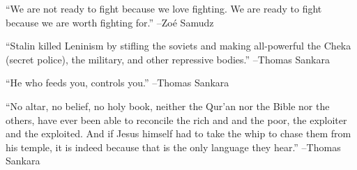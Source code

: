 \documentclass{article}%
\begin{document}
\vspace{1mm}%
\begin{minipage}{\textwidth}%
\flushleft%
“We are not ready to fight because we love fighting. We are ready to fight because we are worth fighting for.”%
\linebreak%
\vspace{1mm}%
–Zoé Samudz%
\linebreak%
\vspace{1mm}%
\end{minipage}%
\linebreak%
\vspace{1mm}%
\begin{minipage}{\textwidth}%
\flushleft%
“Stalin killed Leninism by stifling the soviets and making all{-}powerful the Cheka (secret police), the military, and other repressive bodies.”%
\linebreak%
\vspace{1mm}%
–Thomas Sankara%
\linebreak%
\vspace{1mm}%
\end{minipage}%
\linebreak%
\vspace{1mm}%
\begin{minipage}{\textwidth}%
\flushleft%
“He who feeds you, controls you.”%
\linebreak%
\vspace{1mm}%
–Thomas Sankara%
\linebreak%
\vspace{1mm}%
\end{minipage}%
\linebreak%
\vspace{1mm}%
\begin{minipage}{\textwidth}%
\flushleft%
“No altar, no belief, no holy book, neither the Qur’an nor the Bible nor the others, have ever been able to reconcile the rich and and the poor, the exploiter and the exploited. And if Jesus himself had to take the whip to chase them from his temple, it is indeed because that is the only language they hear.”%
\linebreak%
\vspace{1mm}%
–Thomas Sankara%
\linebreak%
\vspace{1mm}%
\end{minipage}%
\linebreak%
\vspace{1mm}%
\end{document}
